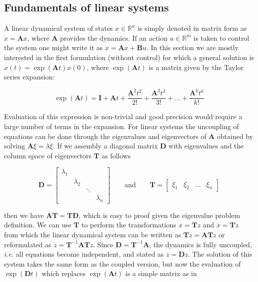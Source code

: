 \subsection{Fundamentals of linear systems}

A linear dynamical system of states $x\in\mathbb{R}^{n}$ is simply denoted in matrix form as $\dot{x}=\mathbf{A}x$, where $\mathbf{A}$ provides the dynamics. If an action $u\in\mathbb{R}^{m}$ is taken to control the system one might write it as $\dot{x}=\mathbf{A}x+\mathbf{B}u$. In this section we are mostly interested in the first formulation (without control) for which a general solution is $x(t)=\exp(\mathbf{A}t)x(0)$, where $\exp(\mathbf{A}t)$ is a matrix given by the Taylor series expansion:

\begin{equation}
\exp(\mathbf{A}t)=\mathbf{I}+\mathbf{A}t+\frac{\mathbf{A}^2t^2}{2!}+\frac{\mathbf{A}^3t^3}{3!}+\dots+\frac{\mathbf{A}^kt^k}{k!}
\end{equation}

Evaluation of this expression is non-trivial and good precision would require a large number of terms in the expansion. For linear systems the uncoupling of equations can be done through the eigenvalues and eigenvectors of $\mathbf{A}$ obtained by solving $\mathbf{A}\xi=\lambda\xi$. If we assembly a diagonal matrix $\mathbf{D}$ with eigenvalues and the column space of eigenvectors $\mathbf{T}$ as follows

\begin{equation}
\mathbf{D}=
\begin{bmatrix}
\lambda_{1} & & & \\
& \lambda_{2} & & \\
& & \ddots & \\
& & & \lambda_{n}
\end{bmatrix}
\qquad\text{and}\qquad
\mathbf{T}=
\begin{bmatrix}
\xi_{1} & \xi_{2} & \dots & \xi_{n}
\end{bmatrix}
\end{equation}

\noindent{}then we have $\mathbf{A}\mathbf{T}=\mathbf{T}\mathbf{D}$, which is easy to proof given the eigenvalue problem definition. We can use $\mathbf{T}$ to perform the transformations $x=\mathbf{T}z$ and $\dot{x}=\mathbf{T}\dot{z}$ from which the linear dynamical system can be written as $\mathbf{T}\dot{z}=\mathbf{A}\mathbf{T}z$ or reformulated as $\dot{z}=\mathbf{T}^{-1}\mathbf{A}\mathbf{T}z$. Since $\mathbf{D}=\mathbf{T}^{-1}\mathbf{A}$, the dynamics is fully uncoupled, \emph{i.e.} all equations become independent, and stated as $\dot{z}=\mathbf{D}z$. The solution of this system takes the same form as the coupled version, but now the evaluation of $\exp(\mathbf{D}t)$ which replaces $\exp(\mathbf{A}t)$ is a simple matrix as in

